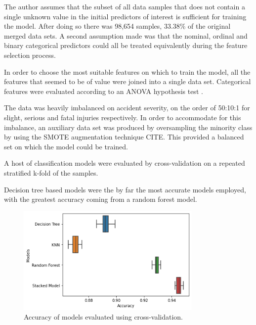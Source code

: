 \documentclass[12pt]{article}
\begin{document}

The author assumes that the subset of all data samples that does not contain a single unknown value in the initial predictors of interest is sufficient for training the model. After doing so there was 98,654 samples, 33.38\% of the original merged data sets. A second assumption made was that the nominal, ordinal and binary categorical predictors could all be treated equivalently during the feature selection process.


In order to choose the most suitable features on which to train the model, all the features that seemed to be of value were joined into a single data set. Categorical features were evaluated according to an ANOVA hypothesis test \parencite{anova}.


The data was heavily imbalanced on accident severity, on the order of 50:10:1 for slight, serious and fatal injuries respectively. In order to accommodate for this imbalance, an auxiliary data set was produced by oversampling the minority class by using the SMOTE augmentation technique CITE. This provided a balanced set on which the model could be trained.


A host of classification models were evaluated by cross-validation on a repeated stratified k-fold of the samples.

Decision tree based models were the by far the most accurate models employed, with the greatest accuracy coming from a random forest model.

\begin{figure}[h]
\centering     %
\includegraphics[width=0.80\textwidth]{model_plot}
\caption{Accuracy of models evaluated using cross-validation.}
\label{models}
\end{figure}
\end{document}
